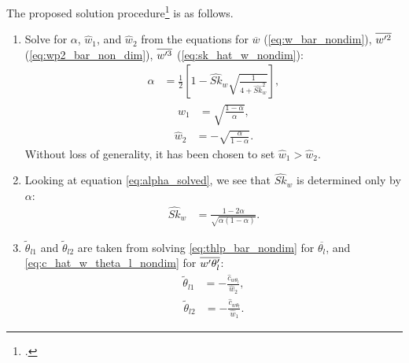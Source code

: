 The proposed solution procedure\footcite{larson2005using} is as follows.
\begin{enumerate}
    \item Solve for $\alpha$, $\widehat{w}_1$,
    and $\widehat{w}_2$ from the equations for $\overline{w}$ (\cref{eq:w_bar_nondim}),
    $\overline{w'^2}$ (\cref{eq:wp2_bar_non_dim}), $\overline{w'^3}$ (\cref{eq:sk_hat_w_nondim}):
    \begin{align}
        \label{eq:alpha_solved}
        \alpha
        &= \frac{1}{2}\left[1 - \widehat{Sk}_w \sqrt{\frac{1}{4 + \widehat{Sk}_w^2}}\right],
    \end{align}
    \begin{align}
        \label{eq:w1_solved}
        \widehat{w}_1
        &= \sqrt{\frac{1-\alpha}{\alpha}},
    \end{align}
    \begin{align}
        \label{eq:w2_solved}
        \widehat{w}_2
        &= -\sqrt{\frac{\alpha}{1-\alpha}}.
    \end{align}
    Without loss of generality, it has been chosen to set $\widehat{w}_1 > \widehat{w}_2$.

    \item Looking at equation \cref{eq:alpha_solved},
    we see that $\widehat{Sk}_w$ is determined only by $\alpha$:
    \begin{align}
        \label{eq:sk_w_alpha}
        \widehat{Sk}_w
        &= \frac{1-2\alpha}{\sqrt{\alpha(1-\alpha)}}.
    \end{align}

    \item $\tilde{\theta}_{l1}$ and $\tilde{\theta}_{l2}$ are taken from solving \cref{eq:thlp_bar_nondim}
    for $\overline{\theta_l}$, and \cref{eq:c_hat_w_theta_l_nondim} for $\overline{w' \theta_l'}$:
    \begin{align}
        \label{eq:thl1_tilde_solved}
        \tilde{\theta}_{l1}
        &= -\frac{\widehat{c}_{w \theta_l}}{\widehat{w}_2},
    \end{align}
    \begin{align}
        \label{eq:thl2_tilde_solved}
        \tilde{\theta}_{l2}
        &= -\frac{\widehat{c}_{w \theta_l}}{\widehat{w}_1}.
    \end{align}


\end{enumerate}
